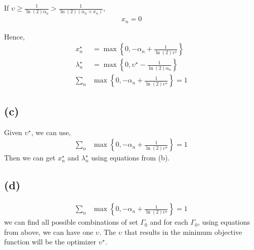 \documentclass[12pt, a4 paper]{article}
\begin{document}
\begin{framed}
        If $\upsilon \geq \frac{1}{\ln(2) \alpha_{n}} > \frac{1}
        {\ln(2) (\alpha_{n}+ x_{n})}$,
        \begin{align}
            x_{n} = 0
        \end{align}

        \indent Hence,
            \begin{align}
                x^{\star}_{n} &= \max \left\{ 0, -\alpha_{n} + 
                \frac{1}{\ln(2) \upsilon^{\star}} \right\}\\
                \lambda^{\star}_{n} &= \max \left\{ 
                    0, \upsilon^{\star} - \frac{1}{\ln(2)\alpha_{n}}
                \right\}\\
                \sum\limits_{n} &\max \left\{ 0, -\alpha_{n} + 
                \frac{1}{\ln(2) \upsilon^{\star}} \right\} = 1
            \end{align}


        \subsection{(c)}
        Given $\upsilon^{\star}$, we can use,
        \begin{align}
            \sum\limits_{n} &\max \left\{ 0, -\alpha_{n} + 
            \frac{1}{\ln(2) \upsilon^{\star}} \right\} = 1
        \end{align}
        \indent Then we can get $x^{\star}_{n}$ and $\lambda_{n}^{\star}$ using equations
         from (b).

         \subsection{(d)}
         \begin{align}
            \sum\limits_{n} &\max \left\{ 0, -\alpha_{n} + 
            \frac{1}{\ln(2) \upsilon^{\star}} \right\} = 1
        \end{align}
        \indent we can find all possible combinations of set $\Gamma_{0}$ and for each
        $\Gamma_{0}$, using equations from above, we can have one $\upsilon$. The $\upsilon$
        that results in the minimum objective function will be the optimizer $\upsilon^{\star}$.


\end{framed}
\end{document}
